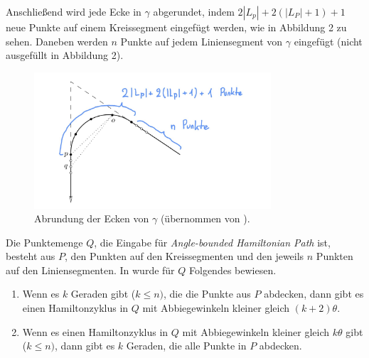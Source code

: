 \documentclass[a4paper, 10pt, ngerman]{article}
\begin{document}
Anschließend wird jede Ecke in $\gamma$ abgerundet, indem $2|L_p| + 2(|L_P| + 1) + 1$ neue Punkte auf einem Kreissegment eingefügt werden, wie in Abbildung 2 zu sehen. Daneben werden $n$ Punkte auf jedem Liniensegment von $\gamma$ eingefügt (nicht ausgefüllt in Abbildung 2).

\begin{figure}[h]
    \centering
    \includegraphics[width=250pt]{grafiken/wenigerkrumm-np2.jpg}
    \caption{Abrundung der Ecken von $\gamma$ (übernommen von \cite{nphard}).}
\end{figure}

 Die Punktemenge $Q$, die Eingabe für \emph{Angle-bounded Hamiltonian Path} ist, besteht aus $P$, den Punkten auf den Kreissegmenten und den jeweils $n$ Punkten auf den Liniensegmenten. In \cite{nphard} wurde für $Q$ Folgendes bewiesen.

\begin{enumerate}
    \item Wenn es $k$ Geraden gibt ($k \le n)$, die die Punkte aus $P$ abdecken, dann gibt es einen Hamiltonzyklus in $Q$ mit Abbiegewinkeln kleiner gleich $(k + 2)\theta$.
    \item Wenn es einen Hamiltonzyklus in $Q$ mit Abbiegewinkeln kleiner gleich $k\theta$ gibt ($k \le n)$, dann gibt es $k$ Geraden, die alle Punkte in $P$ abdecken. 
\end{enumerate}
\end{document}
